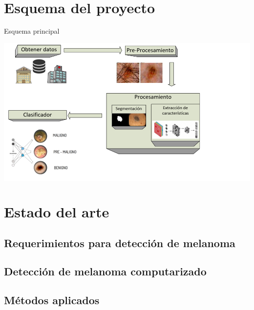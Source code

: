 \documentclass{beamer}
\begin{document}
\section{Esquema del proyecto}

\begin{frame}{Esquema principal}

\includegraphics[scale=0.6]{esquema_v01}

\end{frame} 

\section{Estado del arte}
\subsection{Requerimientos para detección de melanoma}

\begin{frame}

\end{frame}

\subsection{Detección de melanoma computarizado }

\begin{frame}

\end{frame}

\subsection{Métodos aplicados }
\end{document}
